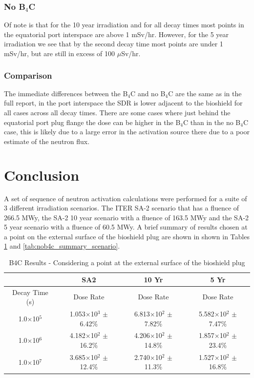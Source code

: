 \documentclass[12pt]{article}
\begin{document}
\subsubsection*{No B$_4$C}
Of note is that for the 10 year irradiation and for all decay 
times most points in the equatorial port interspace are above 1 mSv/hr. However,
for the 5 year irradiation we see that by the second decay time most points 
are under 1 mSv/hr, but are still in excess of 100 $\mu$Sv/hr. 
\subsubsection*{Comparison}
The immediate differences between the B$_4$C and no B$_4$C are the same as in 
the full report, in the port interspace the SDR is lower adjacent to the 
bioshield for all cases across all decay times. There are some cases where
just behind the equatorial port plug flange the dose can be higher in the 
B$_4$C than in the no B$_4$C case, this is likely due to a large error in the 
activation source there due to a poor estimate of the neutron flux. 
\clearpage
\newpage
\section{Conclusion}
A set of sequence of neutron activation calculations were performed for a suite 
of 3 different irradiation scenarios. The ITER SA-2 scenario that has a
fluence of 266.5 MWy, the SA-2 10 year scenario with a fluence of 163.5 MWy and
the SA-2 5 year scenario with a fluence of 60.5 MWy. A brief summary of
results chosen at a point on the external surface of the bioshield plug are shown in
shown in Tables \ref{tab:b4c_summary_scenario} and \ref{tab:nob4c_summary_scenario}.

\begin{table}[ht!]
   \centering      
   \begin{tabular}{| c | c | c | c |}
      \hline
      & SA2 & 10 Yr & 5 Yr \\
      \hline
      Decay Time (s) & Dose Rate & Dose Rate & Dose Rate \\
      \hline
      1.0$\times$10$^{5}$ & 1.053$\times$10$^{3}$ $\pm$ 6.42\% & 6.813$\times$10$^{2}$ $\pm$ 7.82\% & 5.582$\times$10$^{2}$ $\pm$ 7.47\%\\
      1.0$\times$10$^{6}$ & 4.182$\times$10$^{2}$ $\pm$ 16.2\% & 4.206$\times$10$^{2}$ $\pm$ 14.8\% & 1.857$\times$10$^{2}$ $\pm$ 23.4\%\\
      1.0$\times$10$^{7}$ & 3.685$\times$10$^{2}$ $\pm$ 12.4\% & 2.740$\times$10$^{2}$ $\pm$ 11.3\% & 1.527$\times$10$^{2}$ $\pm$ 16.8\%\\
      \hline
\end{tabular}
\caption{B4C Results - Considering a point at the external surface of the bioshield plug}
\label{tab:b4c_summary_scenario}
\end{table}
\end{document}

